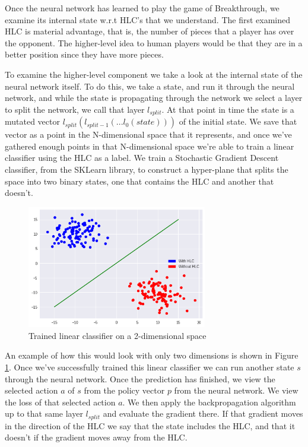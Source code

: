 Once the neural network has learned to play the game of Breakthrough, we examine its internal state w.r.t HLC's that we understand. The first examined HLC is material advantage, that is, the number of pieces that a player has over the opponent. The higher-level idea to human players would be that they are in a better position since they have more pieces.

To examine the higher-level component we take a look at the internal state of the neural network itself. To do this, we take a state, and run it through the neural network, and while the state is propagating through the network we select a layer to split the network, we call that layer $l_{split}$. At that point in time the state is a mutated vector $l_{split}(l_{split-1}(...l_0(state)))$ of the initial state. We save that vector as a point in the N-dimensional space that it represents, and once we've gathered enough points in that N-dimensional space we're able to train a linear classifier using the HLC as a label. We train a Stochastic Gradient Descent classifier, from the SKLearn library, to construct a hyper-plane that splits the space into two binary states, one that contains the HLC and another that doesn't.

\begin{figure}[]
    \centering
    \includegraphics[width=0.7\textwidth]{graphics/linear_separation}
    \caption{Trained linear classifier on a 2-dimensional space}
    \label{fig:scattersplit}
\end{figure}

An example of how this would look with only two dimensions is shown in Figure \ref{fig:scattersplit}. Once we've successfully trained this linear classifier we can run another state $s$ through the neural network. Once the prediction has finished, we view the selected action $a$ of $s$ from the policy vector $p$ from the neural network. We view the loss of that selected action $a$. We then apply the backpropagation algorithm up to that same layer $l_{split}$ and evaluate the gradient there. If that gradient moves in the direction of the HLC we say that the state includes the HLC, and that it doesn't if the gradient moves away from the HLC.

